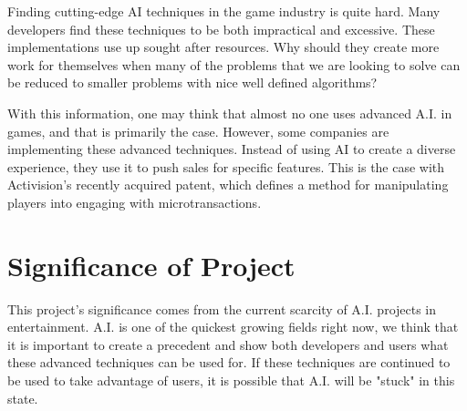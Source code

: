 Finding cutting-edge AI techniques in the game industry is quite hard. Many developers find these techniques to be both impractical and excessive. These implementations use up sought after resources. Why should they create more work for themselves when many of the problems that we are looking to solve can be reduced to smaller problems with nice well defined algorithms?

With this information, one may think that almost no one uses advanced A.I. in games, and that is primarily the case. However, some companies are implementing these advanced techniques. Instead of using AI to create a diverse experience, they use it to push sales for specific features. This is the case with Activision's recently acquired patent, which defines a method for manipulating players into engaging with microtransactions.



\section{Significance of Project} 

This project's significance comes from the current scarcity of A.I. projects in entertainment. A.I. is one of the quickest growing fields right now, we think that it is important to create a precedent and show both developers and users what these advanced techniques can be used for. If these techniques are continued to be used to take advantage of users, it is possible that A.I. will be "stuck" in this state.


